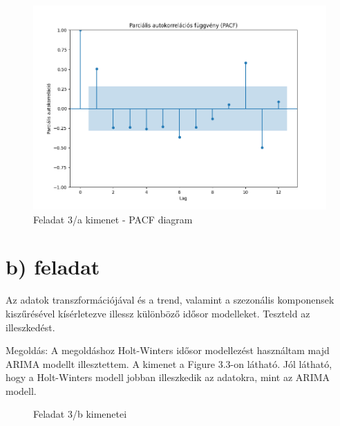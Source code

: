 \documentclass[11pt,a4paper,oneside]{report}
\begin{document}
\begin{figure}[!ht]
  \begin{center}
    \includegraphics[scale=0.4]{Figure_3.png}
    \caption{Feladat 3/a kimenet - PACF diagram}
    \label{fig:TexnicCenter}
  \end{center}
\end{figure}
\section{b) feladat}
Az adatok transzformációjával és a trend, valamint a szezonális komponensek kiszűrésével kísérletezve illessz különböző idősor modelleket. Teszteld az illeszkedést.

Megoldás:
A megoldáshoz Holt-Winters idősor modellezést használtam majd ARIMA modellt illesztettem.
A kimenet a Figure 3.3-on látható. Jól látható, hogy a Holt-Winters modell jobban illeszkedik az adatokra, mint az ARIMA modell.

\begin{figure}%
  \centering
  \qquad
  \caption{Feladat 3/b kimenetei}%
  \label{fig:example}%
\end{figure}
\end{document}

